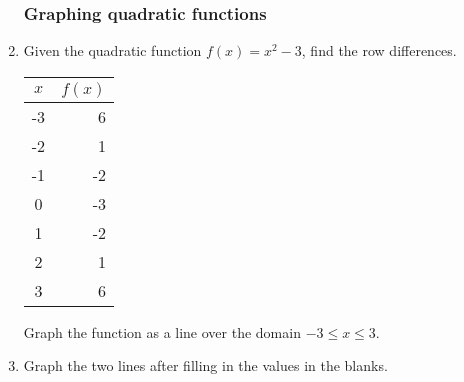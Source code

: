 \documentclass[12pt, twoside]{article}
\begin{document}
\begin{enumerate}
  \newpage
        \subsubsection*{Graphing quadratic functions}

        \item Given the quadratic function $f(x)=x^2-3$, find the row differences.
          \renewcommand{\arraystretch}{1.6}
            \begin{center}
              \begin{tabular}{|c|r|}
              \hline
              $x$ & $f(x)$\\
              \hline
              -3 & 6 \\
              \hline
              -2 & 1 \\
              \hline
              -1 & -2 \\
              \hline
              0 & -3 \\
              \hline
              1 & -2 \\
              \hline
              2 & 1 \\
              \hline
              3 & 6 \\
              \hline
              \end{tabular}
            \end{center}
        Graph the function as a line over the domain $-3 \leq x \leq 3$.

        \begin{center} %
        \end{center}
\newpage

    \item Graph the two lines after filling in the values in the blanks.\\[0.5cm]



\end{enumerate}
\end{document}
